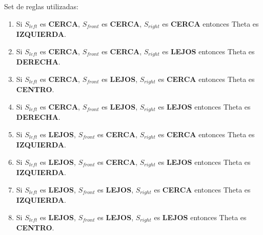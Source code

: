 Set de reglas utilizadas:
\begin{enumerate}
    \item Si $S_{left}$ es \textbf{CERCA}, $S_{front}$ es \textbf{CERCA}, $S_{right}$ es \textbf{CERCA} entonces Theta es \textbf{IZQUIERDA}.
    \item Si $S_{left}$ es \textbf{CERCA}, $S_{front}$ es \textbf{CERCA}, $S_{right}$ es \textbf{LEJOS} entonces Theta es \textbf{DERECHA}.
    \item Si $S_{left}$ es \textbf{CERCA}, $S_{front}$ es \textbf{LEJOS}, $S_{right}$ es \textbf{CERCA} entonces Theta es \textbf{CENTRO}.
    \item Si $S_{left}$ es \textbf{CERCA}, $S_{front}$ es \textbf{LEJOS}, $S_{right}$ es \textbf{LEJOS} entonces Theta es \textbf{DERECHA}.
    \item Si $S_{left}$ es \textbf{LEJOS}, $S_{front}$ es \textbf{CERCA}, $S_{right}$ es \textbf{CERCA} entonces Theta es \textbf{IZQUIERDA}.
    \item Si $S_{left}$ es \textbf{LEJOS}, $S_{front}$ es \textbf{CERCA}, $S_{right}$ es \textbf{LEJOS} entonces Theta es \textbf{IZQUIERDA}.
    \item Si $S_{left}$ es \textbf{LEJOS}, $S_{front}$ es \textbf{LEJOS}, $S_{right}$ es \textbf{CERCA} entonces Theta es \textbf{IZQUIERDA}.
    \item Si $S_{left}$ es \textbf{LEJOS}, $S_{front}$ es \textbf{LEJOS}, $S_{right}$ es \textbf{LEJOS} entonces Theta es \textbf{CENTRO}.
\end{enumerate}